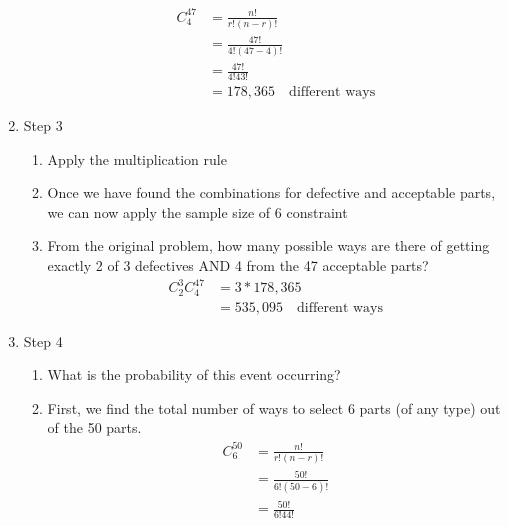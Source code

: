 \documentclass[../IND E 315.tex]{subfiles}
\begin{document}
\begin{enumerate}
\begin{enumerate}
\begin{equation*}
                    \begin{aligned}
                        C^{47}_4 &= \frac{n!}{r!(n-r)!} \\
                                    &= \frac{47!}{4!(47-4)!} \\
                                    &= \frac{47!}{4!43!} \\
                                    &= 178,365 \quad \text{different ways}
                    \end{aligned}
                \end{equation*} 
        \end{enumerate}
    \item Step 3
        \begin{enumerate}
            \item Apply the multiplication rule
            \item Once we have found the combinations for defective and acceptable parts, we can now apply the sample size of 6 constraint
            \item From the original problem, how many possible ways are there of getting exactly 2 of 3 defectives AND 4 from the 47 acceptable parts?
                \begin{equation*}
                    \begin{aligned}
                        C^3_2 C^{47}_4 &= 3 * 178,365 \\
                                    &= 535,095 \quad \text{different ways}
                    \end{aligned}
                \end{equation*}     
        \end{enumerate}
    \item Step 4
        \begin{enumerate}
            \item What is the probability of this event occurring?
            \item First, we find the total number of ways to select 6 parts (of any type) out of the 50 parts.
                \begin{equation*}
                    \begin{aligned}
                        C^{50}_6 &= \frac{n!}{r!(n-r)!} \\
                                &= \frac{50!}{6!(50-6)!} \\ 
                                &= \frac{50!}{6!44!} \\

\end{aligned}
\end{equation*}
\end{enumerate}
\end{enumerate}
\end{document}
